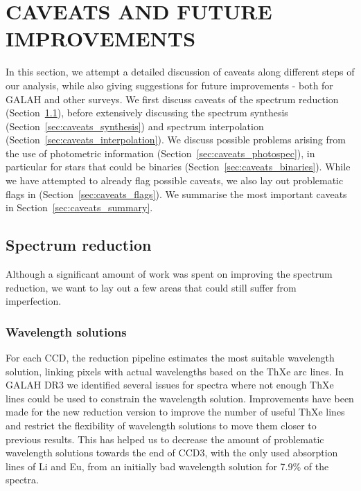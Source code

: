 \documentclass[
  journal=pasa,
  manuscript=research-paper, %
  year=2024,
  volume=37
]{cup-journal}
\begin{document}
\section{CAVEATS AND FUTURE IMPROVEMENTS} \label{sec:caveats}

In this section, we attempt a detailed discussion of caveats along different steps of our analysis, while also giving suggestions for future improvements - both for GALAH and other surveys. We first discuss caveats of the spectrum reduction (Section~\ref{sec:caveats_reduction}), before extensively discussing the spectrum synthesis (Section~\ref{sec:caveats_synthesis}) and spectrum interpolation (Section~\ref{sec:caveats_interpolation}). We discuss possible problems arising from the use of photometric information (Section~\ref{sec:caveats_photospec}), in particular for stars that could be binaries (Section~\ref{sec:caveats_binaries}). While we have attempted to already flag possible caveats, we also lay out problematic flags in (Section~\ref{sec:caveats_flags}). We summarise the most important caveats in Section~\ref{sec:caveats_summary}.

\subsection{Spectrum reduction}  \label{sec:caveats_reduction}

Although a significant amount of work was spent on improving the spectrum reduction, we want to lay out a few areas that could still suffer from imperfection.

\subsubsection{Wavelength solutions}

For each CCD, the reduction pipeline estimates the most suitable wavelength solution, linking pixels with actual wavelengths based on the ThXe arc lines. In GALAH DR3 \citep{Buder2021} we identified several issues for spectra where not enough ThXe lines could be used to constrain the wavelength solution. Improvements have been made for the new reduction version to improve the number of useful ThXe lines and restrict the flexibility of wavelength solutions to move them closer to previous results. This has helped us to decrease the amount of problematic wavelength solutions towards the end of CCD3, with the only used absorption lines of Li and Eu, from an initially bad wavelength solution for 7.9\% of the spectra.
\end{document}
